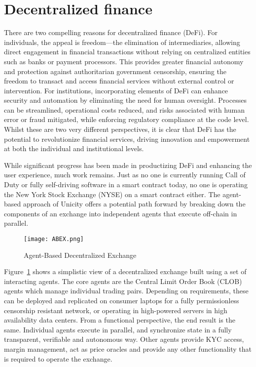\documentclass{article}
\begin{document}
\section{Decentralized finance}

There are two compelling reasons for decentralized finance (DeFi). For individuals, the appeal is freedom---the elimination of intermediaries, allowing direct engagement in financial transactions without relying on centralized entities such as banks or payment processors. This provides greater financial autonomy and protection against authoritarian government censorship, ensuring the freedom to transact and access financial services without external control or intervention. For institutions, incorporating elements of DeFi can enhance security and automation by eliminating the need for human oversight. Processes can be streamlined, operational costs reduced, and risks associated with human error or fraud mitigated, while enforcing regulatory compliance at the code level. Whilst these are two very different perspectives, it is clear that DeFi has the potential to revolutionize financial services, driving innovation and empowerment at both the individual and institutional levels.



While significant progress has been made in productizing DeFi and enhancing the user experience, much work remains. Just as no one is currently running Call of Duty or fully self-driving software in a smart contract today, no one is operating the New York Stock Exchange (NYSE) on a smart contract either. The agent-based approach of Unicity offers a potential path forward by breaking down the components of an exchange into independent agents that execute off-chain in parallel.

\begin{figure}[H]
    \centering
    \texttt{[image: ABEX.png]}
    \caption{Agent-Based Decentralized Exchange}
    \label{fig:ABEX}
\end{figure}


Figure~\ref{fig:ABEX} shows a simplistic view of a decentralized exchange built using a set of interacting agents. The core agents are the Central Limit Order Book (CLOB) agents which manage individual trading pairs. Depending on requirements, these can be deployed and replicated on consumer laptops for a fully permissionless censorship resistant network, or operating in high-powered servers in high availability data centers. From a functional perspective, the end result is the same. Individual agents execute in parallel, and synchronize state in a fully transparent, verifiable and autonomous way. Other agents provide KYC access, margin management, act as price oracles and provide any other functionality that is required to operate the exchange.
\end{document}
